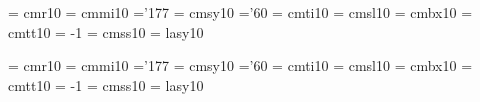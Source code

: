  \font\elvrm  = cmr10    \@halfmag %
 \font\elvmi  = cmmi10   \@halfmag %
    \skewchar\elvmi ='177          %
 \font\elvsy  = cmsy10   \@halfmag %
    \skewchar\elvsy ='60           %
 \font\elvit  = cmti10   \@halfmag %
 \font\elvsl  = cmsl10   \@halfmag %
 \font\elvbf  = cmbx10   \@halfmag %
 \font\elvtt  = cmtt10   \@halfmag %
    \hyphenchar\elvtt = -1         %
 \font\elvsf  = cmss10   \@halfmag %
 \font\elvly  = lasy10  \@halfmag %

 \font\twlrm  = cmr10     %
 \font\twlmi  = cmmi10    %
    \skewchar\twlmi ='177          %
 \font\twlsy  = cmsy10    %
    \skewchar\twlsy ='60           %
 \font\twlit  = cmti10    %
 \font\twlsl  = cmsl10    %
 \font\twlbf  = cmbx10    %
 \font\twltt  = cmtt10    %
    \hyphenchar\twltt = -1         %
 \font\twlsf  = cmss10    %
 \font\twlly  = lasy10   %

